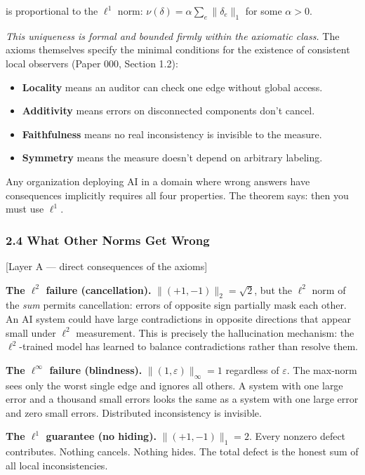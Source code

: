 \documentclass[
]{article}
\providecommand{\tightlist}{%
  \setlength{\itemsep}{0pt}\setlength{\parskip}{0pt}}
\begin{document}
is proportional to the \(\ell^1\) norm:
\(\nu(\delta) = \alpha \sum_e \|\delta_e\|_1\) for some \(\alpha > 0\).

\emph{This uniqueness is formal and bounded firmly within the axiomatic
class.} The axioms themselves specify the minimal conditions for the
existence of consistent local observers (Paper 000, Section 1.2):

\begin{itemize}
\tightlist
\item
  \textbf{Locality} means an auditor can check one edge without global
  access.
\item
  \textbf{Additivity} means errors on disconnected components don't
  cancel.
\item
  \textbf{Faithfulness} means no real inconsistency is invisible to the
  measure.
\item
  \textbf{Symmetry} means the measure doesn't depend on arbitrary
  labeling.
\end{itemize}

Any organization deploying AI in a domain where wrong answers have
consequences implicitly requires all four properties. The theorem says:
then you must use \(\ell^1\).

\subsubsection{2.4 What Other Norms Get
Wrong}\label{what-other-norms-get-wrong}

{[}Layer A --- direct consequences of the axioms{]}

\textbf{The \(\ell^2\) failure (cancellation).}
\(\|(+1, -1)\|_2 = \sqrt{2}\), but the \(\ell^2\) norm of the \emph{sum}
permits cancellation: errors of opposite sign partially mask each other.
An AI system could have large contradictions in opposite directions that
appear small under \(\ell^2\) measurement. This is precisely the
hallucination mechanism: the \(\ell^2\)-trained model has learned to
balance contradictions rather than resolve them.

\textbf{The \(\ell^\infty\) failure (blindness).}
\(\|(1, \varepsilon)\|_\infty = 1\) regardless of \(\varepsilon\). The
max-norm sees only the worst single edge and ignores all others. A
system with one large error and a thousand small errors looks the same
as a system with one large error and zero small errors. Distributed
inconsistency is invisible.

\textbf{The \(\ell^1\) guarantee (no hiding).} \(\|(+1, -1)\|_1 = 2\).
Every nonzero defect contributes. Nothing cancels. Nothing hides. The
total defect is the honest sum of all local inconsistencies.
\end{document}
